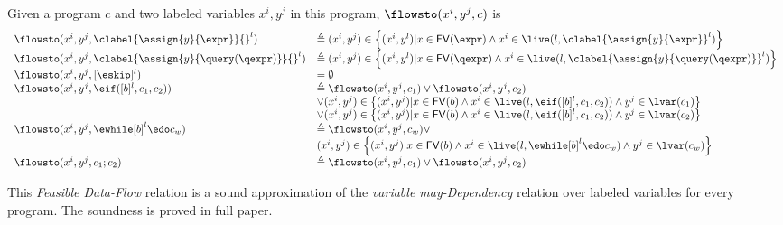 \begin{defn}
  \label{def:feasible_flowsto}
  Given a program $c$ and two labeled variables $x^i, y^j$  in this program, 
  $\flowsto(x^i, y^j, c)$ is 
    {\small
    \[
   \begin{array}{ll}
    \flowsto(x^i, y^j, \clabel{\assign{y}{\expr}}{}^l)  
    & \triangleq (x^i, y^j) \in \left\{ (x^i, y^l) | x \in \mathsf{FV}(\expr) 
    \land x^i \in \live(l, \clabel{\assign{y}{\expr}}^l) \right\}  \\
    \flowsto(x^i, y^j, \clabel{\assign{y}{\query(\qexpr)}}{}^l)  
    & \triangleq (x^i, y^j) \in \left\{ (x^i, y^l) | x \in \mathsf{FV}(\qexpr) 
    \land x^i \in \live(l,\clabel{\assign{y}{\query(\qexpr)}}^l) \right\}  \\
    \flowsto(x^i, y^j, [\eskip]^{l})  & = \emptyset \\
    \flowsto(x^i, y^j, \eif ([b]^l, c_1, c_2))  & \triangleq \flowsto(x^i, y^j, c_1) \lor \flowsto(x^i, y^j, c_2) \\ 
        & \lor (x^i, y^j) \in
        \left\{(x^i,y^j) | x \in \mathsf{FV}(b) \land 
      x^i \in \live(l, \eif ([b]^l, c_1, c_2)) \land  y^j \in \lvar(c_1) \right\} \\
       &\lor (x^i, y^j) \in \left\{(x^i,y^j) | x \in \mathsf{FV}(b) \land 
      x^i\in \live(l, \eif ([b]^l, c_1, c_2))  \land  y^j \in \lvar(c_2)  \right\} \\
       \flowsto(x^i, y^j, \ewhile [b]^l \edo c_w)  & \triangleq  \flowsto(x^i, y^j, c_w)  \lor
       \\ & 
       (x^i, y^j) \in  \left\{(x^i,y^j) | x \in \mathsf{FV}(b) \land 
      x^i \in \live(l,   \ewhile [b]^l \edo c_w) \land  y^j \in \lvar(c_w) \right\} \\
       \flowsto(x^i, y^j, c_1 ;c_2)  & \triangleq \flowsto(x^i, y^j, c_1) \lor \flowsto(x^i, y^j, c_2) \\
   \end{array}
   \]
   }
   \end{defn}
%
This \emph{Feasible Data-Flow} relation is a sound approximation 
of the \emph{variable may-Dependency} relation over labeled variables for every program.
The soundness is proved in full paper.
%
